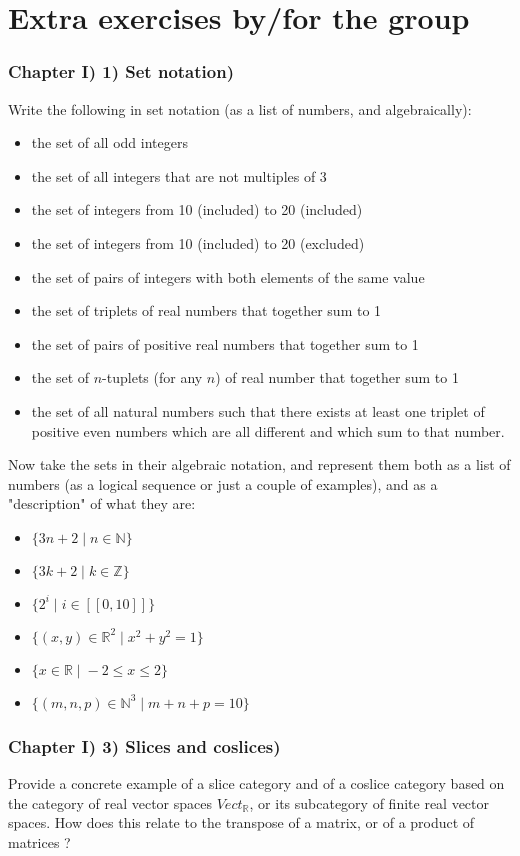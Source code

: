 \part{Extra exercises by/for the group}

\section*{Chapter I) 1) Set notation)}

Write the following in set notation (as a list of numbers, and algebraically):
\begin{itemize}
	\item the set of all odd integers
	\item the set of all integers that are not multiples of 3
	\item the set of integers from 10 (included) to 20 (included)
	\item the set of integers from 10 (included) to 20 (excluded)
	\item the set of pairs of integers with both elements of the same value
	\item the set of triplets of real numbers that together sum to 1
	\item the set of pairs of positive real numbers that together sum to 1
	\item the set of $n$-tuplets (for any $n$) of real number that together sum to 1
	\item the set of all natural numbers such that there exists at least one triplet of positive even numbers which are all different and which sum to that number.
\end{itemize}

Now take the sets in their algebraic notation, and represent them both as a list of numbers (as a logical sequence or just a couple of examples), and as a "description" of what they are:

\begin{itemize}
	\item $\{3n + 2 \; | \; n \in \mathbb{N} \}$
	\item $\{3k + 2 \; | \; k \in \mathbb{Z} \}$
	\item $\{ 2^i \; | \; i \in [[0, 10]] \}$
	\item $\{ (x, y) \in \mathbb{R}^2 \; | \; x^2 + y^2 = 1 \}$
	\item $\{ x \in \mathbb{R} \; | \; -2 \leq x \leq 2 \}$
	\item $\{ (m, n, p) \in \mathbb{N}^3 \; | \; m + n + p = 10 \}$
\end{itemize}



\section*{Chapter I) 3) Slices and coslices)}

Provide a concrete example of a slice category and of a coslice category based on the category of real vector spaces $Vect_{\mathbb{R}}$, or its subcategory of finite real vector spaces.
How does this relate to the transpose of a matrix, or of a product of matrices ?

\newpage
